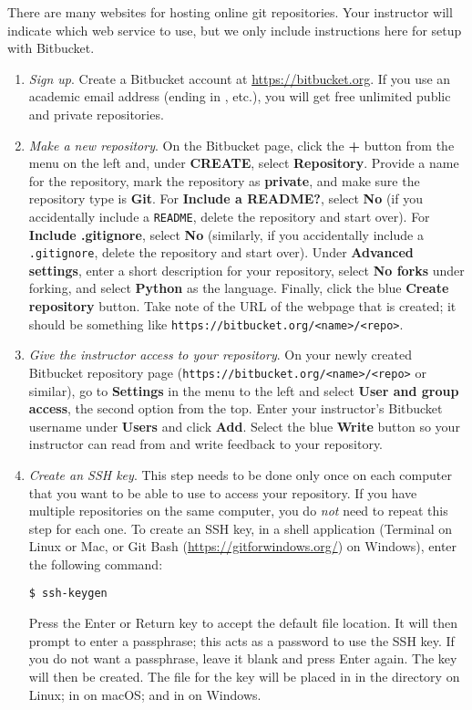 There are many websites for hosting online git repositories.
Your instructor will indicate which web service to use, but we only include instructions here for setup with Bitbucket.

\begin{enumerate}
\item \emph{Sign up}.
\label{step:sign-up}
Create a Bitbucket account at \url{https://bitbucket.org}.
If you use an academic email address (ending in , etc.), you will get free unlimited public and private repositories.

\item \emph{Make a new repository}.
On the Bitbucket page, click the \textbf{+} button from the menu on the left and, under \textbf{CREATE}, select \textbf{Repository}.
Provide a name for the repository, mark the repository as \textbf{private}, and make sure the repository type is \textbf{Git}.
For \textbf{Include a README?}, select \textbf{No} (if you accidentally include a \texttt{README}, delete the repository and start over).
For \textbf{Include .gitignore}, select \textbf{No}  (similarly, if you accidentally include a \texttt{.gitignore}, delete the repository and start over).
Under \textbf{Advanced settings}, enter a short description for your repository, select \textbf{No forks} under forking, and select \textbf{Python} as the language.
Finally, click the blue \textbf{Create repository} button.
Take note of the URL of the webpage that is created; it should be something like \texttt{https://bitbucket.org/<name>/<repo>}.

\item \emph{Give the instructor access to your repository}.
On your newly created Bitbucket repository page (\texttt{https://bitbucket.org/<name>/<repo>} or similar), go to \textbf{Settings} in the menu to the left and select \textbf{User and group access}, the second option from the top.
Enter your instructor's Bitbucket username under \textbf{Users} and click \textbf{Add}.
Select the blue \textbf{Write} button so your instructor can read from and write feedback to your repository.

\item \emph{Create an SSH key}.
This step needs to be done only once on each computer that you want to be able to use to access your repository.
If you have multiple repositories on the same computer, you do \emph{not} need to repeat this step for each one.
To create an SSH key,
in a shell application (Terminal on Linux or Mac, or Git Bash (\url{https://gitforwindows.org/}) on Windows), enter the following command:
\begin{lstlisting}
$ ssh-keygen
\end{lstlisting}
Press the Enter or Return key to accept the default file location.
It will then prompt to enter a passphrase; this acts as a password to use the SSH key.
If you do not want a passphrase, leave it blank and press Enter again.
The key will then be created.
The file for the key will be placed in in the  directory on Linux; in  on macOS; and in  on Windows.


\end{enumerate}
